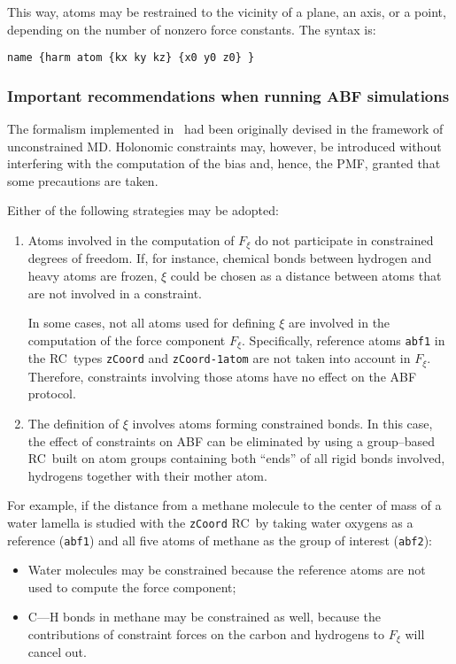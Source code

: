 This way, atoms may be restrained to the vicinity of a plane, an axis, or
a point, depending on the number of nonzero force constants. The syntax is:
\begin{verbatim}
name {harm atom {kx ky kz} {x0 y0 z0} }
\end{verbatim}



\subsubsection{Important recommendations when running ABF simulations}


The formalism implemented in \namd \ had been originally devised in the
framework of unconstrained MD. Holonomic constraints may, however,
be introduced without interfering with the computation of the bias and, hence,
the PMF, granted that some precautions are taken.


Either of the following strategies may be adopted:
\begin{enumerate}
\renewcommand{\labelenumi}{(\arabic{enumi})}
\item Atoms involved in the computation of $F_\xi$ do not participate in
constrained degrees of freedom.
If, for instance, chemical bonds between hydrogen and heavy
atoms are frozen, $\xi$ could
be chosen as a distance between atoms that are not involved
in a constraint.


In some cases, not all atoms used for defining $\xi$ are involved in
the computation of the force component $F_\xi$. Specifically, reference
atoms \texttt{abf1} in the RC\ types \texttt{zCoord} and \texttt{zCoord-1atom}
are not taken into account in $F_\xi$. Therefore, constraints involving
those atoms have no effect on the ABF protocol.


\item The definition of $\xi$ involves atoms forming constrained bonds.
In this case, the effect of constraints on ABF can be eliminated
by using a group--based RC\ built on atom groups
containing both ``ends'' of all rigid bonds involved, \ie hydrogens
together with their mother atom.
\end{enumerate}


For example, if the distance from a methane molecule to the center
of mass of a water lamella is studied with the \texttt{zCoord}
RC\ by taking water oxygens as a reference (\texttt{abf1}) and
all five atoms of methane as the group of interest (\texttt{abf2}):
\begin{itemize}
\item Water molecules may be constrained because the reference
atoms are not used to compute the force component;
\item C---H bonds in methane may be constrained as well, because
the contributions of constraint forces on the carbon and hydrogens
to $F_\xi$ will cancel out.
\end{itemize}



